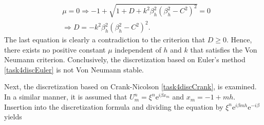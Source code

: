 \begin{equation*}
    \begin{split}
        &\mu = 0 \Rightarrow -1 + \sqrt{1 + D + k^2 \beta_h^2 (\beta_h^2-C^2)^2} = 0 \\ & \Rightarrow D = -k^2 \beta_h^2(\beta_h^2-C^2)^2.
    \end{split}
\end{equation*}
The last equation is clearly a contradiction to the criterion that $D \geq 0$. Hence, there exists no positive constant $\mu$ independent of $h$ and $k$ that satisfies the Von Neumann criterion. Conclusively, the discretization based on Euler's method \eqref{task4discEuler} is not Von Neumann stable. 

Next, the discretization based on Crank-Nicolson \eqref{task4discCrank}, is examined. In a similar manner, it is assumed that $U_m^n = \xi^n \mathrm{e}^{i\beta x_m}$ and $x_m = -1 + mh$. Insertion into the discretization formula and dividing the equation by $\xi^n \mathrm{e}^{i \beta m h}\mathrm{e}^{-i\beta}$ yields

